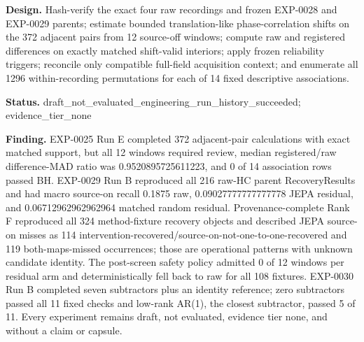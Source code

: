 \textbf{Design.} Hash-verify the exact four raw recordings and frozen EXP-0028 and EXP-0029 parents; estimate bounded translation-like phase-correlation shifts on the 372 adjacent pairs from 12 source-off windows; compute raw and registered differences on exactly matched shift-valid interiors; apply frozen reliability triggers; reconcile only compatible full-field acquisition context; and enumerate all 1296 within-recording permutations for each of 14 fixed descriptive associations.

\textbf{Status.} draft\_not\_evaluated\_engineering\_run\_history\_succeeded; evidence\_tier\_none

\textbf{Finding.} EXP-0025 Run E completed 372 adjacent-pair calculations with exact matched support, but all 12 windows required review, median registered/raw difference-MAD ratio was 0.9520895725611223, and 0 of 14 association rows passed BH. EXP-0029 Run B reproduced all 216 raw-HC parent RecoveryResults and had macro source-on recall 0.1875 raw, 0.09027777777777778 JEPA residual, and 0.06712962962962964 matched random residual. Provenance-complete Rank F reproduced all 324 method-fixture recovery objects and described JEPA source-on misses as 114 intervention-recovered/source-on-not-one-to-one-recovered and 119 both-maps-missed occurrences; those are operational patterns with unknown candidate identity. The post-screen safety policy admitted 0 of 12 windows per residual arm and deterministically fell back to raw for all 108 fixtures. EXP-0030 Run B completed seven subtractors plus an identity reference; zero subtractors passed all 11 fixed checks and low-rank AR(1), the closest subtractor, passed 5 of 11. Every experiment remains draft, not evaluated, evidence tier none, and without a claim or capsule.

